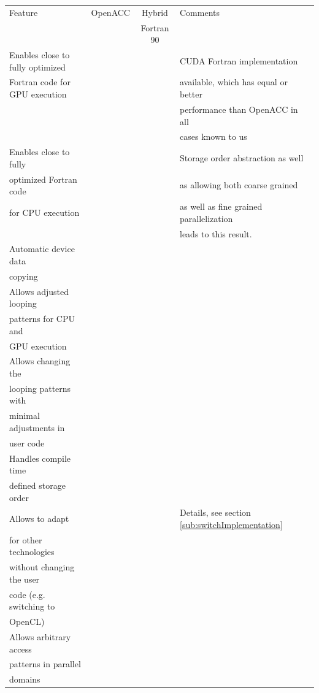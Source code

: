 \begin{table}[htpb]
	\centering
	\footnotesize
	\begin{tabular}{l|c|c|l}
		Feature & OpenACC & Hybrid & Comments \\
		& & Fortran 90 & \\
		\hline \hline
		Enables close to fully optimized  & & \checkmark & CUDA Fortran implementation \\
		Fortran code for GPU execution & & & available, which has equal or better \\
		& & & performance than OpenACC in all \\
		& & & cases known to us \\
		\hline
		Enables close to fully & & \checkmark & Storage order abstraction as well \\
		optimized Fortran code & & & as allowing both coarse grained \\
		for CPU execution & & & as well as fine grained parallelization \\
		& & & leads to this result. \\
		\hline
		Automatic device data & \checkmark & \checkmark & \\
		copying & & & \\
		\hline
		Allows adjusted looping & & \checkmark & \\
		patterns for CPU and & & & \\
		GPU execution & & & \\
		\hline
		Allows changing the & & \checkmark & \\
		looping patterns with & & & \\
		minimal adjustments in & & & \\
		user code & & & \\
		\hline
		Handles compile time & & \checkmark & \\
		defined storage order & & & \\
		\hline
		Allows to adapt & & \checkmark & Details, see section \ref{sub:switchImplementation} \\
		for other technologies & & & \\
		without changing the user & & & \\
		code (e.g. switching to & & & \\
		OpenCL) & & & \\
		\hline
		Allows arbitrary access & \checkmark & \checkmark &  \\
		patterns in parallel & & & \\
		domains & & & \\

\end{tabular}
\end{table}
